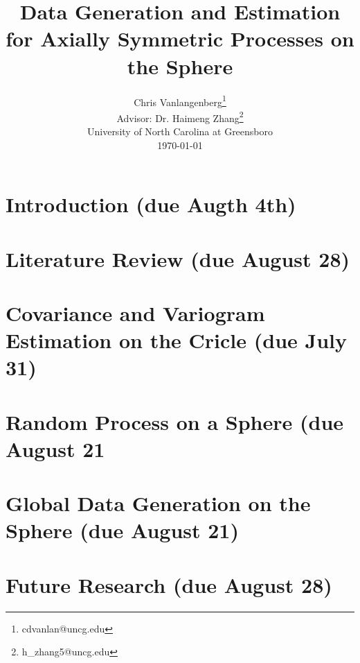 
\usepackage{graphicx}

\usepackage{Sweave}




\title{{\bf\Large Data Generation and Estimation for Axially Symmetric Processes on the Sphere }}


\author{Chris Vanlangenberg\footnote{cdvanlan@uncg.edu} \\
\bigskip
Advisor: Dr. Haimeng Zhang\footnote{h\_zhang5@uncg.edu}\\ \small{University of North Carolina at Greensboro}\\
\small \today}

\maketitle 
\thispagestyle{empty}



\newpage
\chapter{Introduction (due Augth 4th)}


\chapter{Literature Review (due August 28)}



\chapter{Covariance and Variogram Estimation on the Cricle (due July 31)}


\chapter{Random Process on a Sphere (due August 21 }


\chapter{Global Data Generation on the Sphere (due August 21)}


\chapter{Future Research (due August 28)}





